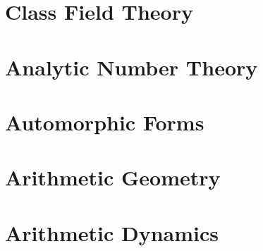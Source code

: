 \part{Class Field Theory}

%





\part{Analytic Number Theory}





\part{Automorphic Forms}

\part{Arithmetic Geometry}
%


%

\part{Arithmetic Dynamics}

%
%




\printindex

